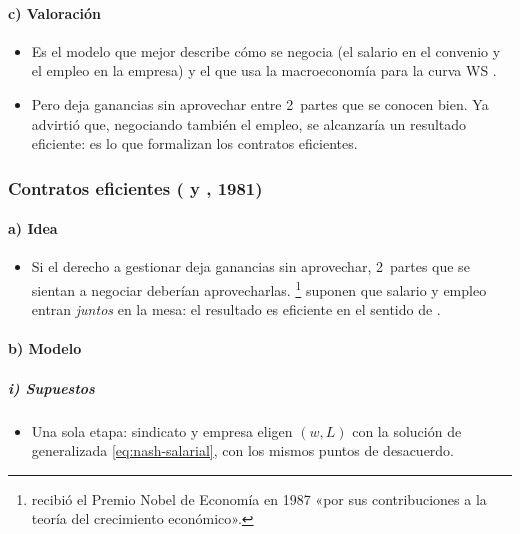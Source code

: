 \documentclass[11pt]{article}
\begin{document}
\paragraph{c) Valoración}

\begin{itemize}
\item Es el modelo que mejor describe cómo se negocia (el salario en el convenio y el empleo en la empresa) y el que usa la macroeconomía para la curva WS .
\item Pero deja ganancias sin aprovechar entre 2~partes que se conocen bien. Ya \textcite{Leontief1946Pure} advirtió que, negociando también el empleo, se alcanzaría un resultado eficiente: es lo que formalizan los contratos eficientes.
\end{itemize}

\subsubsection{Contratos eficientes ( y , 1981)}\label{sec:contratos-eficientes}

\paragraph{a) Idea}

\begin{itemize}
\item Si el derecho a gestionar deja ganancias sin aprovechar, 2~partes que se sientan a negociar deberían aprovecharlas. \textcite{McDonaldSolow1981Wage}\footnote{ recibió el Premio Nobel de Economía en 1987 «por sus contribuciones a la teoría del crecimiento económico»\nocite{Nobel1987Solow}.} suponen que salario y empleo entran \emph{juntos} en la mesa: el resultado es eficiente en el sentido de .
\end{itemize}

\paragraph{b) Modelo}

\subparagraph{i) Supuestos}

\begin{itemize}
\item Una sola etapa: sindicato y empresa eligen $(w,L)$ con la solución de  generalizada \eqref{eq:nash-salarial}, con los mismos puntos de desacuerdo.
\end{itemize}
\end{document}
